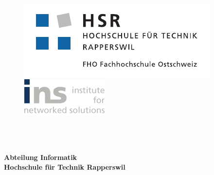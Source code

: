 \begin{titlepage}
\begin{flushleft}

\begin{figure}[tbp]
  \begin{minipage}[c]{0.4\textwidth}
    \includegraphics[width=\textwidth]{../document_files/images/hsr_logo.pdf}
  \end{minipage}
  \hfill
  \begin{minipage}[c]{0.3\textwidth}
    \includegraphics[width=\textwidth]{../document_files/images/ins_logo.png}
  \end{minipage}
\end{figure}



\noindent\begin{minipage}[t]{0.49\textwidth}
  \begin{flushleft}
    \vspace{0pt}
  \end{flushleft}
\end{minipage}
\hfill
\begin{minipage}[t]{0.49\textwidth}
  \begin{flushright}
    \vspace{0pt}
  \end{flushright}
\end{minipage}
\\[4cm]

{\Huge \bfseries \TITLE}\\[4cm]
{\huge \bfseries \SUBTITLE}\\[0.5cm]

{\large \bfseries Abteilung Informatik}\\
{\large \bfseries Hochschule für Technik Rapperswil}\\

\vfill




\end{flushleft}
\end{titlepage}
